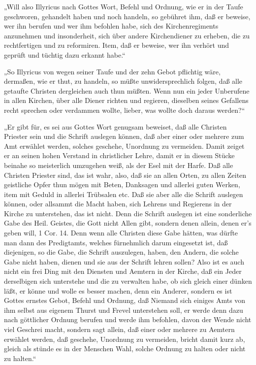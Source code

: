 „Will also Illyricus nach Gottes Wort, Befehl und Ordnung, wie er in der Taufe geschworen, gehandelt haben und
noch handeln, so gebühret ihm, daß er beweise, wer ihn berufen und wer ihm befohlen habe, sich des Kirchenregiments
anzunehmen und insonderheit, sich über andere Kirchendiener zu erheben, die zu rechtfertigen und zu reformiren. Item,
daß er beweise, wer ihn verhört und geprüft und tüchtig dazu erkannt habe.“

„So Illyricus von wegen seiner Taufe und der zehn Gebot pflichtig wäre, dermaßen, wie er thut, zu handeln, so
müßte unwidersprechlich folgen, daß alle getaufte Christen dergleichen auch thun müßten. Wenn nun ein jeder
Unberufene in allen Kirchen, über alle Diener richten und regieren, dieselben seines Gefallens recht sprechen
oder verdammen wollte, lieber, was wollte doch daraus werden?“

„Er gibt für, es sei aus Gottes Wort genugsam beweiset, daß alle Christen Priester sein und die Schrift auslegen
können, daß aber einer oder mehrere zum Amt erwählet werden, solches geschehe, Unordnung zu vermeiden. Damit
zeiget er an seinen hohen Verstand in christlicher Lehre, damit er in diesem Stücke beinahe so meisterlich umzugehen
weiß, als der Esel mit der Harfe. Daß alle Christen Priester sind, das ist wahr, also, daß sie an allen Orten,
zu allen Zeiten geistliche Opfer thun mögen mit Beten, Danksagen und allerlei guten Werken, item mit Geduld in
allerlei Trübsalen etc. Daß sie aber alle die Schrift auslegen können, oder allsammt die Macht haben, sich
Lehrens und Regierens in der Kirche zu unterstehen, das ist nicht. Denn die Schrift auslegen ist eine sonderliche
Gabe des Heil. Geistes, die Gott nicht Allen gibt, sondern denen allein, denen er’s geben will, 1 Cor. 14. Denn
wenn alle Christen diese Gabe hätten, was dürfte man dann des Predigtamts, welches fürnehmlich darum eingesetzt
ist, daß diejenigen, so die Gabe, die Schrift auszulegen, haben, den Andern, die solche Gabe nicht haben, dienen
und sie aus der Schrift lehren sollen? Also ist es auch nicht ein frei Ding mit den Diensten und Aemtern in der
Kirche, daß ein Jeder derselbigen sich unterstehe und die zu verwalten habe, ob sich gleich einer dünken läßt,
er könne und wolle es besser machen, denn ein Anderer, sondern es ist Gottes ernstes Gebot, Befehl und Ordnung,
daß Niemand sich einiges Amts von ihm selbst aus eigenem Thurst und Frevel unterstehen soll, er werde denn dazu
nach göttlicher Ordnung berufen und werde ihm befohlen, davon der Wende nicht viel Geschrei macht, sondern sagt
allein, daß einer oder mehrere zu Aemtern erwählet
werden, daß geschehe, Unordnung zu vermeiden, bricht damit kurz ab, gleich als stünde es in der Menschen Wahl,
solche Ordnung zu halten oder nicht zu halten.“

